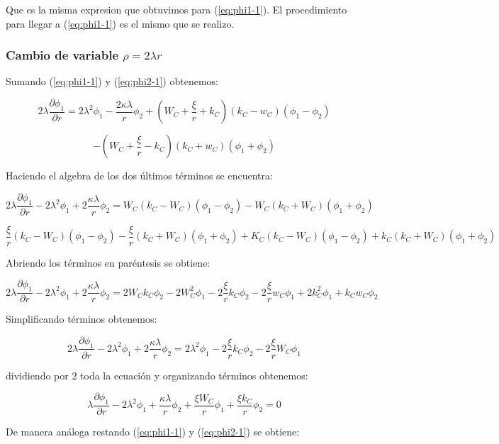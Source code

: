 \documentclass[a4paper, 12pt]{article} %
\begin{document}
Que es la misma expresion que obtuvimos para (\ref{eq:phi1-1}). El procedimiento para llegar a (\ref{eq:phi1-1}) es el mismo que se realizo.

 
\subsubsection{Cambio de variable $\rho=2\lambda r$} 

Sumando  (\ref{eq:phi1-1}) y  (\ref{eq:phi2-1}) obtenemos:

\[
2 \lambda \dfrac{\partial \phi_1}{\partial r} = 2 \lambda^2  \phi_1 
- \dfrac{2 \kappa \lambda }{r}\phi_2 + \left( W_C + \dfrac{\xi}{r} + k_C  \right ) 
(k_C - w_C)(\phi_1 - \phi_2) 
\]

\[
- \left( W_C + \dfrac{\xi}{r} - k_C  \right )(k_C + w_C)(\phi_1 + \phi_2) 
\]

Haciendo el algebra de los dos \'ultimos t\'erminos se encuentra:

\[
2 \lambda \dfrac{\partial \phi_1}{\partial r} -  2 \lambda^2  \phi_1 + 2\dfrac{\kappa \lambda}{r}\phi_2
= W_C(k_C - W_C)(\phi_1 - \phi_2) - W_C(k_C + W_C)(\phi_1 + \phi_2)
\]

\[
\dfrac{\xi}{r}(k_C - W_C)(\phi_1 - \phi_2) - \dfrac{\xi}{r}(k_C + W_C)(\phi_1 + \phi_2)
+ K_C (k_C - W_C)(\phi_1 - \phi_2) + k_C (k_C + W_C)(\phi_1 + \phi_2)
\]

Abriendo los t\'erminos en par\'entesis se obtiene:

\[
2 \lambda \dfrac{\partial \phi_1}{\partial r} -  2 \lambda^2  \phi_1 + 2\dfrac{\kappa \lambda}{r}\phi_2
= 2W_Ck_C\phi_2 - 2W_C^2 \phi_1 - 2 \dfrac{\xi}{r}k_C \phi_2 - 2 \dfrac{\xi}{r}w_C \phi_1 
+ 2 k_C^2 \phi_1  + k_C w_C \phi_2
\]

Simplificando t\'erminos obtenemos:

\[
 2 \lambda \dfrac{\partial \phi_1}{\partial r} -  2 \lambda^2  \phi_1 + 2\dfrac{\kappa \lambda}{r}\phi_2
= 2\lambda^2 \phi_1 - 2 \dfrac{\xi}{r}k_C \phi_2 - 2\dfrac{\xi}{r}W_C \phi_1
\]

dividiendo por $2$ toda la ecuaci\'on y organizando t\'erminos obtenemos:

\begin{equation}
\lambda \dfrac{\partial \phi_1}{\partial r} - 2 \lambda^2 \phi_1 + \dfrac{\kappa \lambda}{r} \phi_2  + \dfrac{\xi W_C}{r} \phi_1 
+ \dfrac{\xi k_C}{r}\phi_2 = 0
\end{equation}

De manera an\'aloga restando (\ref{eq:phi1-1}) y  (\ref{eq:phi2-1}) se obtiene:
\end{document}
